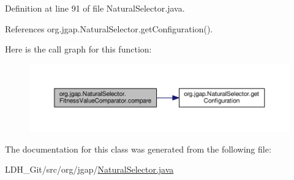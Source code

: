 Definition at line 91 of file Natural\-Selector.\-java.



References org.\-jgap.\-Natural\-Selector.\-get\-Configuration().



Here is the call graph for this function\-:
\nopagebreak
\begin{figure}[H]
\begin{center}
\leavevmode
\includegraphics[width=350pt]{classorg_1_1jgap_1_1_natural_selector_1_1_fitness_value_comparator_aa71752b784c75fe45853451f7afb755c_cgraph}
\end{center}
\end{figure}




The documentation for this class was generated from the following file\-:\begin{DoxyCompactItemize}
\item 
L\-D\-H\-\_\-\-Git/src/org/jgap/\hyperlink{_natural_selector_8java}{Natural\-Selector.\-java}\end{DoxyCompactItemize}
